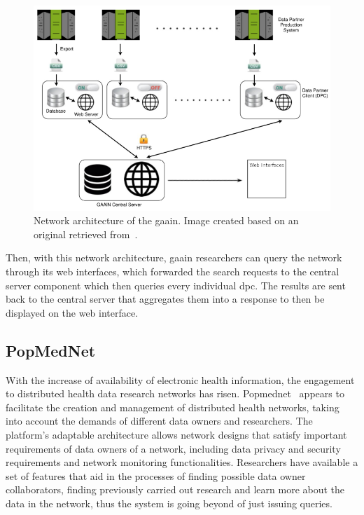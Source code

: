 \begin{figure}[H]
    \centering
    \includegraphics[width=.7\linewidth]{gaain.png}
    \caption{Network architecture of the \gls{gaain}. Image created based on an original retrieved from~\cite{gaain}.}
\end{figure}

Then, with this network architecture, \gls{gaain} researchers can query the network through its web interfaces, which forwarded the search requests to the central server component which then queries every individual \gls{dpc}.
The results are sent back to the central server that aggregates them into a response to then be displayed on the web interface.

\subsection*{PopMedNet}
With the increase of availability of electronic health information, the engagement to distributed health data research networks has risen.
Popmednet~\cite{popmednet} appears to facilitate the creation and management of distributed health networks, taking into account the demands of different data owners and researchers.
The platform's adaptable architecture allows network designs that satisfy important requirements of data owners of a network, including data privacy and security requirements and network monitoring functionalities.
Researchers have available a set of features that aid in the processes of finding possible data owner collaborators, finding previously carried out research and learn more about the data in the network, thus the system is going beyond of just issuing queries.

